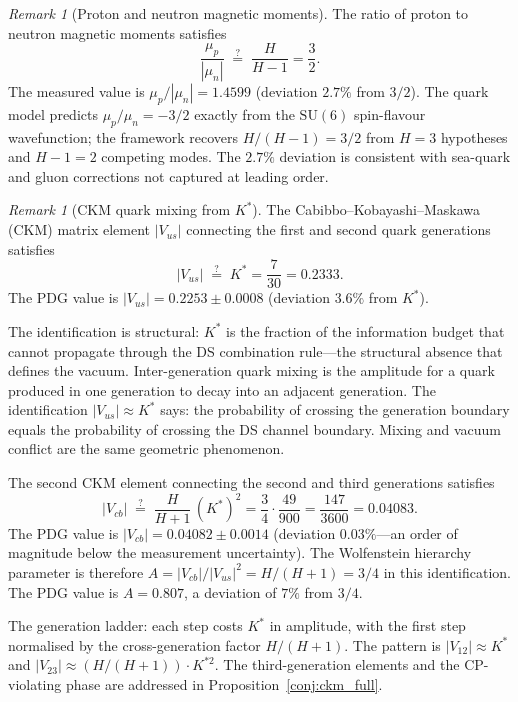 \documentclass[11pt,a4paper]{article}
\theoremstyle{definition}
\theoremstyle{remark}
\newtheorem{remark}[theorem]{Remark}
\begin{document}
\begin{remark}[Proton and neutron magnetic moments]\label{rem:magnetic_moments}
The ratio of proton to neutron magnetic moments satisfies
\begin{equation}\label{eq:mag_moment}
\frac{\mu_p}{|\mu_n|} \;\stackrel{?}{=}\; \frac{H}{H-1} = \frac{3}{2}.
\end{equation}
The measured value is $\mu_p/|\mu_n|=1.4599$ (deviation $2.7\%$ from $3/2$). The quark model predicts $\mu_p/\mu_n=-3/2$ exactly from the $\mathrm{SU}(6)$ spin-flavour wavefunction; the framework recovers $H/(H-1)=3/2$ from $H=3$ hypotheses and $H-1=2$ competing modes. The $2.7\%$ deviation is consistent with sea-quark and gluon corrections not captured at leading order.
\end{remark}

\begin{remark}[CKM quark mixing from $K^*$]\label{rem:ckm}
The Cabibbo--Kobayashi--Maskawa (CKM) matrix element $|V_{us}|$ connecting the first and second quark generations satisfies
\begin{equation}\label{eq:Vus}
|V_{us}| \;\stackrel{?}{=}\; K^* = \frac{7}{30} = 0.2333.
\end{equation}
The PDG value is $|V_{us}|=0.2253\pm 0.0008$ (deviation $3.6\%$ from $K^*$).

The identification is structural: $K^*$ is the fraction of the information budget that cannot propagate through the DS combination rule---the structural absence that defines the vacuum. Inter-generation quark mixing is the amplitude for a quark produced in one generation to decay into an adjacent generation. The identification $|V_{us}|\approx K^*$ says: the probability of crossing the generation boundary equals the probability of crossing the DS channel boundary. Mixing and vacuum conflict are the same geometric phenomenon.

The second CKM element connecting the second and third generations satisfies
\begin{equation}\label{eq:Vcb}
|V_{cb}| \;\stackrel{?}{=}\; \frac{H}{H+1}\,(K^*)^2 = \frac{3}{4}\cdot\frac{49}{900} = \frac{147}{3600} = 0.04083.
\end{equation}
The PDG value is $|V_{cb}|=0.04082\pm 0.0014$ (deviation $0.03\%$---an order of magnitude below the measurement uncertainty). The Wolfenstein hierarchy parameter is therefore $A=|V_{cb}|/|V_{us}|^2=H/(H+1)=3/4$ in this identification. The PDG value is $A=0.807$, a deviation of $7\%$ from $3/4$.

The generation ladder: each step costs $K^*$ in amplitude, with the first step normalised by the cross-generation factor $H/(H+1)$. The pattern is $|V_{12}|\approx K^*$ and $|V_{23}|\approx (H/(H+1))\cdot K^{*2}$. The third-generation elements and the CP-violating phase are addressed in Proposition~\ref{conj:ckm_full}.
\end{remark}
\end{document}
